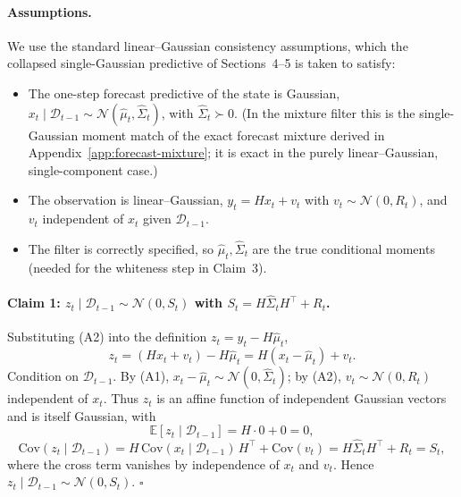 \documentclass{article}
\newcommand{\E}{\mathbb{E}}
\newcommand{\Norm}{\mathcal{N}}
\begin{document}
\paragraph{Assumptions.} We use the standard linear--Gaussian consistency assumptions,
which the collapsed single-Gaussian predictive of Sections~4--5 is taken to satisfy:
\begin{itemize}
  \item[(A1)] The one-step forecast predictive of the state is Gaussian,
  $x_t \mid \mathcal{D}_{t-1} \sim \Norm(\hat\mu_t, \hat\Sigma_t)$, with $\hat\Sigma_t \succ 0$.
  (In the mixture filter this is the single-Gaussian moment match of the exact forecast
  mixture derived in Appendix~\ref{app:forecast-mixture}; it is exact in the purely
  linear--Gaussian, single-component case.)
  \item[(A2)] The observation is linear--Gaussian, $y_t = H x_t + v_t$ with
  $v_t \sim \Norm(0, R_t)$, and $v_t$ independent of $x_t$ given $\mathcal{D}_{t-1}$.
  \item[(A3)] The filter is correctly specified, so $\hat\mu_t,\hat\Sigma_t$ are the true
  conditional moments (needed for the whiteness step in Claim~3).
\end{itemize}

\paragraph{Claim 1: $z_t \mid \mathcal{D}_{t-1} \sim \Norm(0, S_t)$ with
$S_t = H\hat\Sigma_t H^\top + R_t$.}
Substituting (A2) into the definition $z_t = y_t - H\hat\mu_t$,
\[
  z_t = (H x_t + v_t) - H\hat\mu_t = H(x_t - \hat\mu_t) + v_t .
\]
Condition on $\mathcal{D}_{t-1}$. By (A1), $x_t - \hat\mu_t \sim \Norm(0,\hat\Sigma_t)$;
by (A2), $v_t \sim \Norm(0,R_t)$ independent of $x_t$. Thus $z_t$ is an affine function of
independent Gaussian vectors and is itself Gaussian, with
\[
  \E[z_t \mid \mathcal{D}_{t-1}] = H\cdot 0 + 0 = 0,
\]
\[
  \mathrm{Cov}(z_t \mid \mathcal{D}_{t-1})
  = H\,\mathrm{Cov}(x_t\mid\mathcal{D}_{t-1})\,H^\top + \mathrm{Cov}(v_t)
  = H\hat\Sigma_t H^\top + R_t = S_t,
\]
where the cross term vanishes by independence of $x_t$ and $v_t$. Hence
$z_t \mid \mathcal{D}_{t-1} \sim \Norm(0, S_t)$. \hfill$\square$
\end{document}
